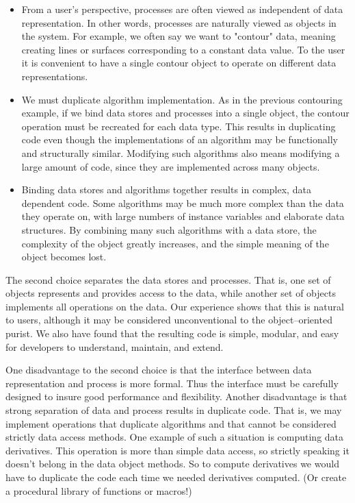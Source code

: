 \begin{itemize}

\item From a user's perspective, processes are often viewed as independent of data representation. In other words, processes are naturally viewed as objects in the system. For example, we often say we want to "contour" data, meaning creating lines or surfaces corresponding to a constant data value. To the user it is convenient to have a single contour object to operate on different data representations.

\item We must duplicate algorithm implementation. As in the previous contouring example, if we bind data stores and processes into a single object, the contour operation must be recreated for each data type. This results in duplicating code even though the implementations of an algorithm may be functionally and structurally similar. Modifying such algorithms also means modifying a large amount of code, since they are implemented across many objects.

\item Binding data stores and algorithms together results in complex, data dependent code. Some algorithms may be much more complex than the data they operate on, with large numbers of instance variables and elaborate data structures. By combining many such algorithms with a data store, the complexity of the object greatly increases, and the simple meaning of the object becomes lost.

\end{itemize}

The second choice separates the data stores and processes. That is, one set of objects represents and provides access to the data, while another set of objects implements all operations on the data. Our experience shows that this is natural to users, although it may be considered unconventional to the object--oriented purist. We also have found that the resulting code is simple, modular, and easy for developers to understand, maintain, and extend.

One disadvantage to the second choice is that the interface between data representation and process is more formal. Thus the interface must be carefully designed to insure good performance and flexibility. Another disadvantage is that strong separation of data and process results in duplicate code. That is, we may implement operations that duplicate algorithms and that cannot be considered strictly data access methods. One example of such a situation is computing data derivatives. This operation is more than simple data access, so strictly speaking it doesn't belong in the data object methods. So to compute derivatives we would have to duplicate the code each time we needed derivatives computed. (Or create a procedural library of functions or macros!)

